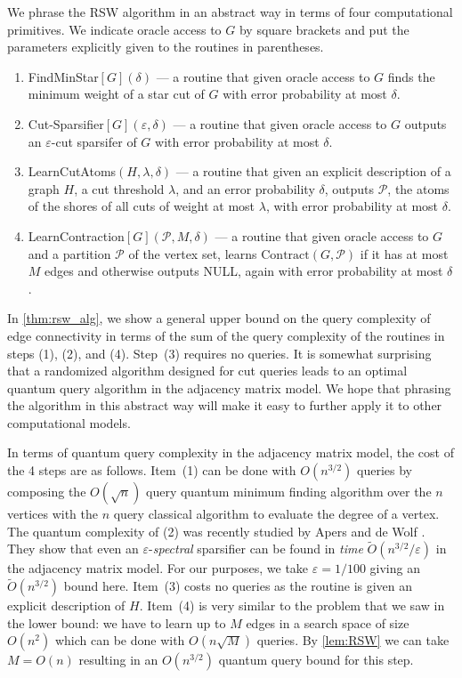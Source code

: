 \documentclass[10pt,a4paper]{article}
\newcommand{\Pcal}{\mathcal{P}}
\newcommand{\Contract}{\mathrm{Contract}}
\newcommand{\tO}{\tilde O}
\newcommand{\1}{\mathbf{1}}
\theoremstyle{definition}
\begin{document}
We phrase the RSW algorithm in an abstract way in terms of four computational primitives.  We indicate oracle access to $G$ by square brackets and put the 
parameters explicitly given to the routines in parentheses.
\begin{enumerate}
  \item FindMinStar$[G](\delta)$ --- a routine that given oracle access to $G$ finds the minimum weight of a star cut of $G$ with error probability at most $\delta$.
  \item Cut-Sparsifier$[G](\varepsilon, \delta)$ --- a routine that given oracle access to $G$ outputs an $\varepsilon$-cut sparsifer of $G$ with error probability at most $\delta$.
  \item LearnCutAtoms$(H, \lambda, \delta)$ --- a routine that given an explicit description of a graph $H$, a cut threshold $\lambda$, and an error probability $\delta$, 
  outputs $\Pcal$, the atoms of the shores of all cuts of weight at most $\lambda$, with error probability at most $\delta$.
  \item LearnContraction$[G](\Pcal, M, \delta)$ --- a routine that given oracle access to $G$ and a partition $\Pcal$ of the vertex set, learns $\Contract(G,\Pcal)$ if it has at most $M$ 
  edges and otherwise outputs NULL, again with error probability at most $\delta$.
\end{enumerate}
In \cref{thm:rsw_alg}, we show a general upper bound on the query complexity of edge connectivity in terms of the sum of the query complexity of the routines in steps (1), (2), and (4).  Step~(3) 
requires no queries.  It is somewhat surprising that a randomized algorithm designed for cut queries leads to an optimal quantum query algorithm in the adjacency matrix model.  We hope that phrasing 
the algorithm in this abstract way will make it easy to further apply it to other computational models.

In terms of quantum query complexity in the adjacency matrix model, the cost of the 4 steps are as follows.
Item~(1) can be done with $O(n^{3/2})$ queries by composing the $O(\sqrt{n})$ query quantum minimum finding algorithm over the $n$ vertices with the $n$ query classical algorithm to evaluate the degree of 
a vertex.  The quantum complexity of (2) was recently studied by Apers and de Wolf \cite{AdW19}.  They 
show that even an $\varepsilon$-\textit{spectral} sparsifier can be found in \emph{time} $\tilde O(n^{3/2}/\varepsilon)$ in the adjacency matrix 
model.  For our purposes, we take $\varepsilon=1/100$ giving an $\tO(n^{3/2})$ bound here. Item~(3) costs no queries as the routine is given an explicit description of $H$.  Item~(4) is very similar to the 
problem that we saw in the lower bound: we have to learn up to $M$ edges in a search space of size $O(n^2)$ which can be done with $O(n \sqrt{M})$ queries.  By \cref{lem:RSW}
we can take $M = O(n)$ resulting in an $O(n^{3/2})$ quantum query bound for this step.
\end{document}
